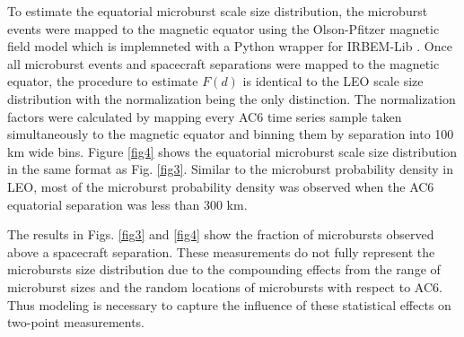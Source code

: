 \documentclass[draft]{agujournal2019}
\begin{document}
To estimate the equatorial microburst scale size distribution, the microburst events were mapped to the magnetic equator using the Olson-Pfitzer magnetic field model \cite{Olson1982} which is implemneted with a Python wrapper for IRBEM-Lib \cite{irbem}. Once all microburst events and spacecraft separations were mapped to the magnetic equator, the procedure to estimate $F(d)$ is identical to the LEO scale size distribution with the normalization being the only distinction. The normalization factors were calculated by mapping every AC6 time series sample taken simultaneously to the magnetic equator and binning them by separation into 100 km wide bins. Figure \ref{fig4} shows the equatorial microburst scale size distribution in the same format as Fig. \ref{fig3}. Similar to the microburst probability density in LEO, most of the microburst probability density was observed when the AC6 equatorial separation was less than 300 km. 

The results in Figs. \ref{fig3} and \ref{fig4} show the fraction of microbursts observed above a spacecraft separation. These measurements do not fully represent the microbursts size distribution due to the compounding effects from the range of microburst sizes and the random locations of microbursts with respect to AC6. Thus modeling is necessary to capture the influence of these statistical effects on two-point measurements.
\end{document}
